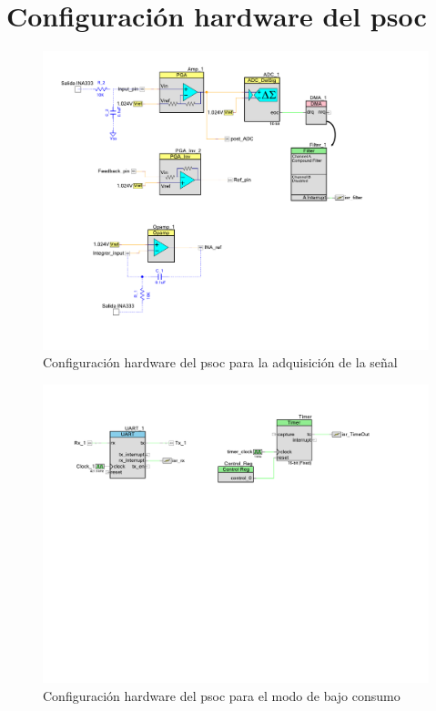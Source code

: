 \newpage
\section{Configuración hardware del \acrshort{psoc}}

\begin{figure}[!ht]
\center
\includegraphics[height=0.85\textwidth , angle=90]{imagenes/hardware_psoc}
\caption{Configuración hardware del \acrshort{psoc} para la adquisición de la señal}
\end{figure}

\newpage

\begin{figure}[!ht]
\center
\includegraphics[width=0.92\textheight , angle=90]{imagenes/hardware_psoc_2}
\caption{Configuración hardware del \acrshort{psoc} para el modo de bajo consumo}
\end{figure}

